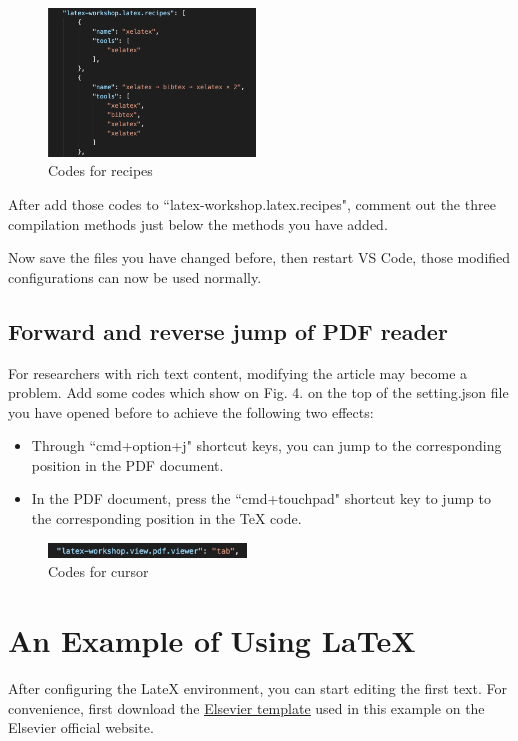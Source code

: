 \documentclass[conference]{IEEEtran}
\begin{document}
\begin{figure}[htbp]
    \centerline{\includegraphics[width=0.49\textwidth]{recipes_confi.png}}
    \caption{Codes for recipes}
    \label{fig3}
\end{figure}

After add those codes to ``latex-workshop.latex.recipes", 
comment out the three compilation methods just below the methods you have added.

Now save the files you have changed before, 
then restart VS Code, 
those modified configurations can now be used normally.

\subsection{Forward and reverse jump of PDF reader}
For researchers with rich text content, 
modifying the article may become a problem. 
Add some codes which show on Fig. 4. on the top of the setting.json file you have opened before to achieve the following two effects:
\begin{itemize}
    \item Through ``cmd+option+j" shortcut keys, you can jump to the corresponding position in the PDF document.
    \item In the PDF document, press the ``cmd+touchpad" shortcut key to jump to the corresponding position in the TeX code.
\end{itemize}

\begin{figure}[htbp]
    \centerline{\includegraphics[width=0.47\textwidth]{pdf_jump.png}}
    \caption{Codes for cursor}
    \label{fig4}
\end{figure}

\section{An Example of Using \LaTeX}
After configuring the LateX environment, 
you can start editing the first text. 
For convenience, 
first download the \href{https://www.elsevier.com/authors/author-schemas/latex-instructions}{\underline{Elsevier template}} used in this example on the Elsevier official website.
\end{document}
